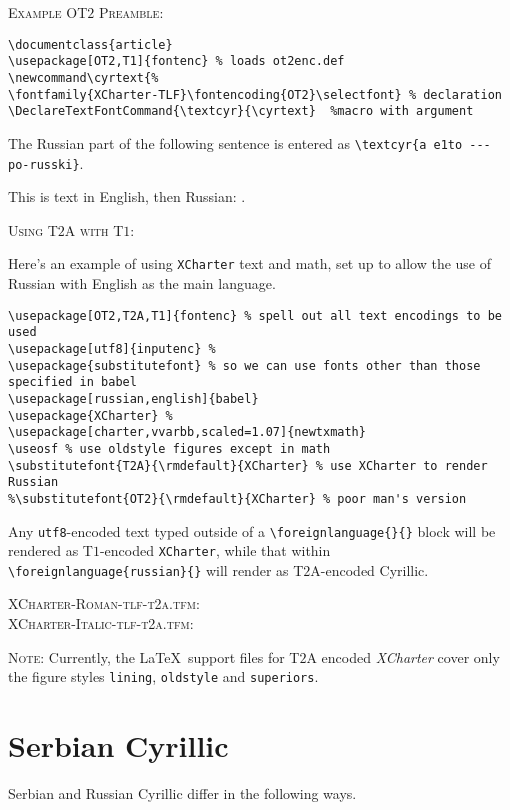 \documentclass[11pt]{article}
\newcommand\cyrtext{\fontfamily{XCharter-TLF}\fontencoding{OT2}\selectfont} %
\begin{document}
\textsc{Example OT$2$ Preamble:}

\begin{verbatim}
\documentclass{article} 
\usepackage[OT2,T1]{fontenc} % loads ot2enc.def
\newcommand\cyrtext{%
\fontfamily{XCharter-TLF}\fontencoding{OT2}\selectfont} % declaration
\DeclareTextFontCommand{\textcyr}{\cyrtext}  %macro with argument
\end{verbatim}
The Russian part of the following sentence is entered as \verb|\textcyr{a e1to --- po-russki}|.

This is text in English, then Russian:
.
\newpage

\textsc{Using T$2$A with T$1$:}

Here's an example of using {\tt XCharter} text and math, set up to allow the use of  Russian with English as the main language.
\begin{verbatim}
\usepackage[OT2,T2A,T1]{fontenc} % spell out all text encodings to be used
\usepackage[utf8]{inputenc} % 
\usepackage{substitutefont} % so we can use fonts other than those specified in babel
\usepackage[russian,english]{babel}
\usepackage{XCharter} % 
\usepackage[charter,vvarbb,scaled=1.07]{newtxmath}
\useosf % use oldstyle figures except in math
\substitutefont{T2A}{\rmdefault}{XCharter} % use XCharter to render Russian 
%\substitutefont{OT2}{\rmdefault}{XCharter} % poor man's version
\end{verbatim}
Any {\tt utf8}-encoded text typed outside of a \verb|\foreignlanguage{}{}| block will be rendered as T$1$-encoded {\tt XCharter}, while that within \verb|\foreignlanguage{russian}{}| will render as T$2$A-encoded Cyrillic. 

\newpage
\textsc{XCharter-Roman-tlf-t2a.tfm}:\\
\newpage
\textsc{XCharter-Italic-tlf-t2a.tfm}:\\

\textsc{Note:} Currently, the \LaTeX\ support files for T$2$A encoded \emph{XCharter} cover only the figure styles {\tt lining}, {\tt oldstyle} and {\tt superiors}.
\section{Serbian Cyrillic}
Serbian and Russian Cyrillic differ in the following ways.
\end{document}
